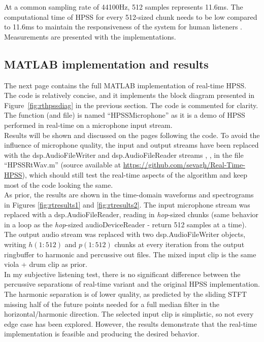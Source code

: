 \documentclass[letter,12pt]{article}
\begin{document}
At a common sampling rate of 44100Hz, 512 samples represents 11.6ms. The computational time of HPSS for every 512-sized chunk needs to be low compared to 11.6ms to maintain the responsiveness of the system for human listeners \cite{realtime}. Measurements are presented with the implementations.

\subsection{MATLAB implementation and results}

The next page contains the full MATLAB implementation of real-time HPSS. The code is relatively concise, and it implements the block diagram presented in Figure~\ref{fig:rthpssdiag} in the previous section. The code is commented for clarity. The function (and file) is named ``HPSSMicrophone'' as it is a demo of HPSS performed in real-time on a microphone input stream.\\

Results will be shown and discussed on the pages following the code. To avoid the influence of microphone quality, the input and output streams have been replaced with the dsp.AudioFileWriter and dsp.AudioFileReader streams \cite{dsp1}, \cite{dsp2}, in the file ``HPSSRtWav.m'' (source available at \url{https://github.com/sevagh/Real-Time-HPSS}), which should still test the real-time aspects of the algorithm and keep most of the code looking the same.\\

As prior, the results are shown in the time-domain waveforms and spectrograms in Figures \ref{fig:rtresults1} and \ref{fig:rtresults2}. The input microphone stream was replaced with a dsp.AudioFileReader, reading in \textit{hop}-sized chunks (same behavior in a loop as the \textit{hop}-sized audioDeviceReader - return 512 samples at a time). The output audio stream was replaced with two dsp.AudioFileWriter objects, writing $h(1:512)$ and $p(1:512)$ chunks at every iteration from the output ringbuffer to harmonic and percussive out files. The mixed input clip is the same viola + drum clip as prior.\\

In my subjective listening test, there is no significant difference between the percussive separations of real-time variant and the original HPSS implementation. The harmonic separation is of lower quality, as predicted by the sliding STFT missing half of the future points needed for a full median filter in the horizontal/harmonic direction. The selected input clip is simplistic, so not every edge case has been explored. However, the results demonstrate that the real-time implementation is feasible and producing the desired behavior.
\end{document}
